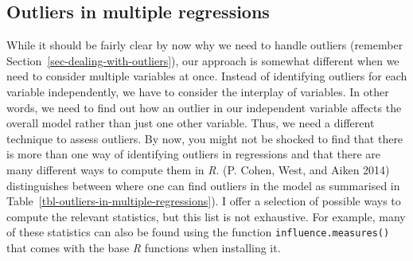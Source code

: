 \documentclass[
  letterpaper,
  DIV=11,
  numbers=noendperiod]{scrreprt}
\begin{document}
\subsection{Outliers in multiple
regressions}\label{sec-outliers-in-multiple-regressions}

While it should be fairly clear by now why we need to handle outliers
(remember Section~\ref{sec-dealing-with-outliers}), our approach is
somewhat different when we need to consider multiple variables at once.
Instead of identifying outliers for each variable independently, we have
to consider the interplay of variables. In other words, we need to find
out how an outlier in our independent variable affects the overall model
rather than just one other variable. Thus, we need a different technique
to assess outliers. By now, you might not be shocked to find that there
is more than one way of identifying outliers in regressions and that
there are many different ways to compute them in \emph{R}. (P. Cohen,
West, and Aiken 2014) distinguishes between where one can find outliers
in the model as summarised in
Table~\ref{tbl-outliers-in-multiple-regressions}). I offer a selection
of possible ways to compute the relevant statistics, but this list is
not exhaustive. For example, many of these statistics can also be found
using the function \texttt{influence.measures()} that comes with the
base \emph{R} functions when installing it.
\end{document}
